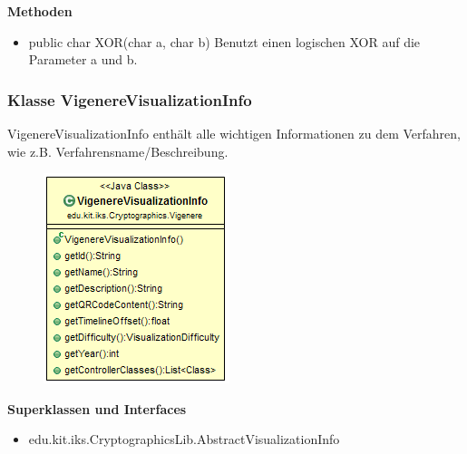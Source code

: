 \documentclass{article}
\begin{document}
      \textbf{Methoden}
      \begin{itemize}
        \item public char XOR(char a, char b) \newline
        Benutzt einen logischen XOR auf die Parameter a und b.
      \end{itemize}

    \subsubsection{Klasse VigenereVisualizationInfo}
      VigenereVisualizationInfo enthält alle wichtigen Informationen zu dem Verfahren, wie z.B. Verfahrensname/Beschreibung.
      \begin{figure}[H]
        \centering
        \includegraphics{resources/edu-kit-iks-Cryptographics-Vigenere-VisualizationInfo}
      \end{figure}

      \textbf{Superklassen und Interfaces}
      \begin{itemize}
        \item edu.kit.iks.CryptographicsLib.AbstractVisualizationInfo
      \end{itemize}
      
\end{document}
